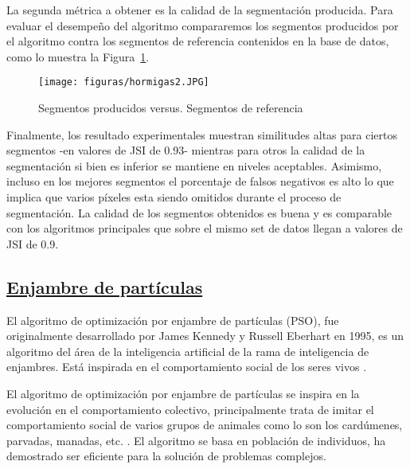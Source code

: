 \documentclass[10pt,conference]{IEEEtran}
\begin{document}
\begin{enumerate}
    La segunda métrica a obtener es la calidad de la segmentación producida. Para evaluar el desempeño del algoritmo compararemos los segmentos producidos por el algoritmo contra los segmentos de referencia contenidos en la base de datos, como lo muestra la Figura~\ref{f2hormiga}.
\begin{figure}[H]
 \begin{center}
       \texttt{[image: figuras/hormigas2.JPG]}
      \caption{Segmentos producidos versus. Segmentos de referencia}
      \label{f2hormiga} 
      \end{center}
\end{figure}
Finalmente, los resultado experimentales muestran similitudes altas para ciertos segmentos -en valores de JSI de 0.93- mientras para otros la calidad de la segmentación si bien es inferior se mantiene en niveles aceptables. Asimismo, incluso en los mejores segmentos el porcentaje de falsos negativos es alto lo que implica que varios píxeles esta siendo omitidos durante el proceso de segmentación. La calidad de los segmentos obtenidos es buena y es comparable con los algoritmos principales que sobre el mismo set de datos llegan a valores de JSI de 0.9.
\end{enumerate}

\subsection{\underline{\textbf{Enjambre de partículas}}}
El algoritmo de optimización por enjambre de partículas (PSO), fue originalmente desarrollado por James Kennedy y Russell Eberhart en 1995, es un algoritmo del área de la inteligencia artificial de la rama de inteligencia de enjambres. Está inspirada en el comportamiento social de los seres vivos \citep{kennedy}. \par
El algoritmo de optimización por enjambre de partículas se inspira en la evolución en el comportamiento colectivo, principalmente trata de imitar el comportamiento social de varios grupos de animales como lo son los cardúmenes, parvadas, manadas, etc. \citep{kennedy1995}. El algoritmo se basa en población de individuos, ha demostrado ser eficiente para la solución de problemas complejos.\par
\end{document}
